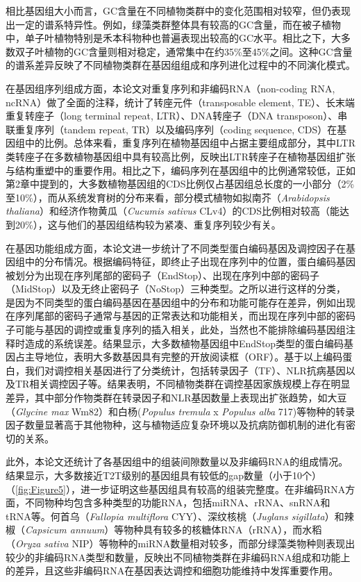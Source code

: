 相比基因组大小而言，GC含量在不同植物类群中的变化范围相对较窄，但仍表现出一定的谱系特异性。例如，绿藻类群整体具有较高的GC含量，而在被子植物中，单子叶植物特别是禾本科物种也普遍表现出较高的GC水平。相比之下，大多数双子叶植物的GC含量则相对稳定，通常集中在约35\%至45\%之间。这种GC含量的谱系差异反映了不同植物类群在基因组组成和序列进化过程中的不同演化模式。

在基因组序列组成方面，本论文对重复序列和非编码RNA（non-coding RNA, ncRNA）做了全面的注释，统计了转座元件（transposable element, TE）、长末端重复转座子（long terminal repeat, LTR）、DNA转座子（DNA transposon）、串联重复序列（tandem repeat, TR）以及编码序列（coding sequence, CDS）在基因组中的比例。总体来看，重复序列在植物基因组中占据主要组成部分，其中LTR类转座子在多数植物基因组中具有较高比例，反映出LTR转座子在植物基因组扩张与结构重塑中的重要作用。相比之下，编码序列在基因组中的比例通常较低，正如第2章中提到的，大多数植物基因组的CDS比例仅占基因组总长度的一小部分（2\%至10\%），而从系统发育树的分布来看，部分模式植物如拟南芥（\textit{Arabidopsis thaliana}）和经济作物黄瓜（\textit{Cucumis sativus} CLv4）的CDS比例相对较高（能达到20\%），这与他们的基因组结构较为紧凑、重复序列较少有关。

在基因功能组成方面，本论文进一步统计了不同类型蛋白编码基因及调控因子在基因组中的分布情况。根据编码特征，即终止子出现在序列中的位置，蛋白编码基因被划分为出现在序列尾部的密码子（EndStop）、出现在序列中部的密码子（MidStop）以及无终止密码子（NoStop）三种类型。之所以进行这样的分类，是因为不同类型的蛋白编码基因在基因组中的分布和功能可能存在差异，例如出现在序列尾部的密码子通常与基因的正常表达和功能相关，而出现在序列中部的密码子可能与基因的调控或重复序列的插入相关，此处，当然也不能排除编码基因组注释时造成的系统误差。结果显示，大多数植物基因组中EndStop类型的蛋白编码基因占主导地位，表明大多数基因具有完整的开放阅读框（ORF）。基于以上编码蛋白，我们对调控相关基因进行了分类统计，包括转录因子（TF）、NLR抗病基因以及TR相关调控因子等。结果表明，不同植物类群在调控基因家族规模上存在明显差异，其中部分作物类群在转录因子和NLR基因数量上表现出扩张趋势，如大豆（\textit{Glycine max} Wm82）和白杨(\textit{Populus tremula} x \textit{Populus alba} 717)等物种的转录因子数量显著高于其他物种，这与植物适应复杂环境以及抗病防御机制的进化有密切的关系\cite{li2025convergent}。

此外，本论文还统计了各基因组中的组装间隙数量以及非编码RNA的组成情况。结果显示，大多数接近T2T级别的基因组具有较低的gap数量（小于10个）（\textcolor{blue}{\autoref{fig:Figure5}}），进一步证明这些基因组具有较高的组装完整度。在非编码RNA方面，不同物种均包含多种类型的功能RNA，包括miRNA、rRNA、snRNA和tRNA等。何首乌（\textit{Fallopia multiflora} CYY）、深纹核桃（\textit{Juglans sigillata}）和辣椒（\textit{Capsicum annuum}）等物种具有较多的核糖体RNA（rRNA），而水稻（\textit{Oryza sativa} NIP）等物种的miRNA数量相对较多，而部分绿藻类物种则表现出较少的非编码RNA类型和数量，反映出不同植物类群在非编码RNA组成和功能上的差异，且这些非编码RNA在基因表达调控和细胞功能维持中发挥重要作用\cite{bartel2004micrornas}。

